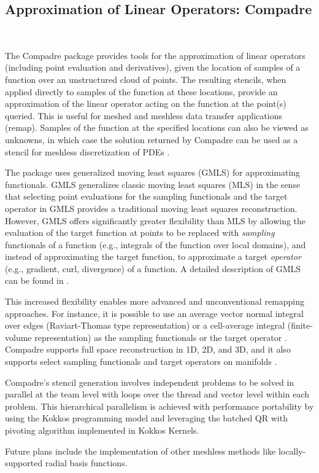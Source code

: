 \subsection{Approximation of Linear Operators: Compadre}\
\label{sec:compadre}

The Compadre package provides tools for the approximation of linear operators (including point evaluation and derivatives), given the location of samples of a function over an unstructured cloud of points. The resulting stencils, when applied directly to samples of the function at these locations, provide an approximation of the linear operator acting on the function at the point(s) queried. This is useful for meshed and meshless data transfer applications (remap). Samples of the function at the specified locations can also be viewed as unknowns, in which case the solution returned by Compadre can be used as a stencil for meshless discretization of PDEs \cite{REBAR2024}.

The package uses generalized moving least squares (GMLS) for approximating functionals. GMLS generalizes classic moving least squares (MLS) in the sense that selecting point evaluations for the sampling functionals and the target operator in GMLS provides a traditional moving least squares reconstruction. However, GMLS offers significantly greater flexibility than MLS by allowing the evaluation of the target function at points to be replaced with \emph{sampling} functionals of a function (e.g., integrals of the function over local domains), and instead of approximating the target function, to approximate a target \emph{operator} (e.g., gradient, curl, divergence) of a function. A detailed description of GMLS can be found in \cite{mirzaei2012generalized,wendland2004scattered}.

This increased flexibility enables more advanced and unconventional remapping approaches. For instance, it is possible to use an average vector normal integral over edges (Raviart-Thomas type representation) or a cell-average integral (finite-volume representation) as the sampling functionals or the target operator \cite{gmd-15-6601-2022}. Compadre supports full space reconstruction in 1D, 2D, and 3D, and it also supports select sampling functionals and target operators on manifolds \cite{GROSS2020109340}.

Compadre's stencil generation involves independent problems to be solved in parallel at the team level with loops over the thread and vector level within each problem. This hierarchical parallelism is achieved with performance portability by using the Kokkos programming model and leveraging the batched QR with pivoting algorithm implemented in Kokkos Kernels.

Future plans include the implementation of other meshless methods like locally-supported radial basis functions.

